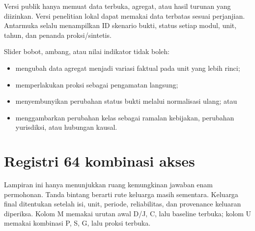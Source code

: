 \documentclass[10pt]{article}
\begin{document}
Versi publik hanya memuat data terbuka, agregat, atau hasil turunan yang diizinkan. Versi penelitian lokal dapat memakai data terbatas sesuai perjanjian. Antarmuka selalu menampilkan ID skenario bukti, status setiap modul, unit, tahun, dan penanda proksi/sintetis.

Slider bobot, ambang, atau nilai indikator tidak boleh:
\begin{itemize}
  \item mengubah data agregat menjadi variasi faktual pada unit yang lebih rinci;
  \item memperlakukan proksi sebagai pengamatan langsung;
  \item menyembunyikan perubahan status bukti melalui normalisasi ulang; atau
  \item menggambarkan perubahan kelas sebagai ramalan kebijakan, perubahan yurisdiksi, atau hubungan kausal.
\end{itemize}

\clearpage
\appendix
\section{Registri 64 kombinasi akses}

Lampiran ini hanya menunjukkan ruang kemungkinan jawaban enam permohonan. Tanda bintang berarti rute keluarga masih sementara. Keluarga final ditentukan setelah isi, unit, periode, reliabilitas, dan provenance keluaran diperiksa. Kolom M memakai urutan awal D/J, C, lalu baseline terbuka; kolom U memakai kombinasi P, S, G, lalu proksi terbuka.
\end{document}
